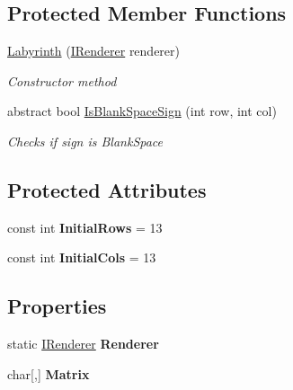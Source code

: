 \subsection*{Protected Member Functions}
\begin{DoxyCompactItemize}
\item 
\hyperlink{class_labyrinth_game_1_1_labyrinths_1_1_labyrinth_a0767a92e3dbb0319ad4cf280fde6fe97}{Labyrinth} (\hyperlink{interface_labyrinth_game_1_1_interfaces_1_1_i_renderer}{I\+Renderer} renderer)
\begin{DoxyCompactList}\small\item\em Constructor method \end{DoxyCompactList}\item 
abstract bool \hyperlink{class_labyrinth_game_1_1_labyrinths_1_1_labyrinth_a1f35ce958322025715acf77852f112fa}{Is\+Blank\+Space\+Sign} (int row, int col)
\begin{DoxyCompactList}\small\item\em Checks if sign is Blank\+Space \end{DoxyCompactList}\end{DoxyCompactItemize}
\subsection*{Protected Attributes}
\begin{DoxyCompactItemize}
\item 
\hypertarget{class_labyrinth_game_1_1_labyrinths_1_1_labyrinth_a3ae41ad53bdc67113d3d220982a0a312}{const int {\bfseries Initial\+Rows} = 13}\label{class_labyrinth_game_1_1_labyrinths_1_1_labyrinth_a3ae41ad53bdc67113d3d220982a0a312}

\item 
\hypertarget{class_labyrinth_game_1_1_labyrinths_1_1_labyrinth_afbb8122fcbb44288d15c3ddbe3b7ba54}{const int {\bfseries Initial\+Cols} = 13}\label{class_labyrinth_game_1_1_labyrinths_1_1_labyrinth_afbb8122fcbb44288d15c3ddbe3b7ba54}

\end{DoxyCompactItemize}
\subsection*{Properties}
\begin{DoxyCompactItemize}
\item 
\hypertarget{class_labyrinth_game_1_1_labyrinths_1_1_labyrinth_a7ebf817e69d4183373ee25b8a04a6dc0}{static \hyperlink{interface_labyrinth_game_1_1_interfaces_1_1_i_renderer}{I\+Renderer} {\bfseries Renderer}}\label{class_labyrinth_game_1_1_labyrinths_1_1_labyrinth_a7ebf817e69d4183373ee25b8a04a6dc0}

\item 
\hypertarget{class_labyrinth_game_1_1_labyrinths_1_1_labyrinth_afa7a0f7f1a93177ca5b1412bc2053e33}{char\mbox{[},\mbox{]} {\bfseries Matrix}}\label{class_labyrinth_game_1_1_labyrinths_1_1_labyrinth_afa7a0f7f1a93177ca5b1412bc2053e33}

\end{DoxyCompactItemize}


